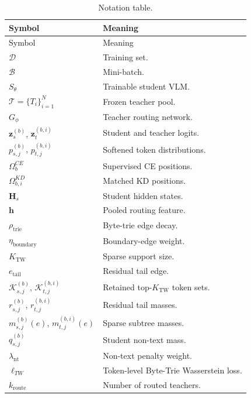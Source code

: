 {
\scriptsize
\setlength{\tabcolsep}{3pt}
\renewcommand{\arraystretch}{1.08}
\begin{longtable}{@{}>{\raggedright\arraybackslash}p{}p{}@{}}
\caption{Notation table.}
\label{tab:notation}\\
\toprule
Symbol & Meaning \\
\midrule
\endfirsthead
\toprule
Symbol & Meaning \\
\midrule
\endhead
\(\mathcal{D}\) & Training set. \\
\(\mathcal{B}\) & Mini-batch. \\
\(S_{\theta}\) & Trainable student VLM. \\
\(\mathcal{T}=\{T_i\}_{i=1}^{N}\) & Frozen teacher pool. \\
\(G_{\phi}\) & Teacher routing network. \\
\addlinespace[4pt]
\(\mathbf{z}_s^{(b)}\), \(\mathbf{z}_t^{(b,i)}\) & Student and teacher logits. \\
\(p_{s,j}^{(b)}\), \(p_{t,j}^{(b,i)}\) & Softened token distributions. \\
\(\Omega_b^{CE}\) & Supervised CE positions. \\
\(\Omega_{b,i}^{KD}\) & Matched KD positions. \\
\(\mathbf{H}_s\) & Student hidden states. \\
\(\mathbf{h}\) & Pooled routing feature. \\
\addlinespace[4pt]
\(\rho_{\mathrm{trie}}\) & Byte-trie edge decay. \\
\(\eta_{\mathrm{boundary}}\) & Boundary-edge weight. \\
\(K_{\mathrm{TW}}\) & Sparse support size. \\
\(e_{\mathrm{tail}}\) & Residual tail edge. \\
\(\mathcal{K}_{s,j}^{(b)}\), \(\mathcal{K}_{t,j}^{(b,i)}\) & Retained top-\(K_{\mathrm{TW}}\) token sets. \\
\(r_{s,j}^{(b)}\), \(r_{t,j}^{(b,i)}\) & Residual tail masses. \\
\(m_{s,j}^{(b)}(e)\), \(m_{t,j}^{(b,i)}(e)\) & Sparse subtree masses. \\
\(q_{s,j}^{(b)}\) & Student non-text mass. \\
\(\lambda_{\mathrm{nt}}\) & Non-text penalty weight. \\
\(\ell_{TW}\) & Token-level Byte-Trie Wasserstein loss. \\
\addlinespace[4pt]
\(k_{\mathrm{route}}\) & Number of routed teachers. \\

\end{longtable}}
